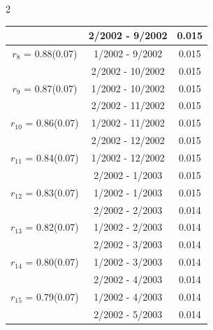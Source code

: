 \begin{multicols}{2}
{\begin{tabular}{ccc}
&        2/2002 -  9/2002 &        0.015  \vspace{-.02in} \\ \hline 
  $r_{ 8}$ = 0.88(0.07) &       1/2002 -  9/2002 &        0.015   \vspace{-.10in} \\  
&        2/2002 - 10/2002 &        0.015  \vspace{-.02in} \\ \hline 
  $r_{ 9}$ = 0.87(0.07) &       1/2002 - 10/2002 &        0.015   \vspace{-.10in} \\  
&        2/2002 - 11/2002 &        0.015  \vspace{-.02in} \\ \hline 
  $r_{10}$ = 0.86(0.07) &       1/2002 - 11/2002 &        0.015   \vspace{-.10in} \\  
&        2/2002 - 12/2002 &        0.015  \vspace{-.02in} \\ \hline 
  $r_{11}$ = 0.84(0.07) &       1/2002 - 12/2002 &        0.015   \vspace{-.10in} \\  
&        2/2002 -  1/2003 &        0.015  \vspace{-.02in} \\ \hline 
  $r_{12}$ = 0.83(0.07) &       1/2002 -  1/2003 &        0.015   \vspace{-.10in} \\  
&        2/2002 -  2/2003 &        0.014  \vspace{-.02in} \\ \hline 
  $r_{13}$ = 0.82(0.07) &       1/2002 -  2/2003 &        0.014   \vspace{-.10in} \\  
&        2/2002 -  3/2003 &        0.014  \vspace{-.02in} \\ \hline 
  $r_{14}$ = 0.80(0.07) &       1/2002 -  3/2003 &        0.014   \vspace{-.10in} \\  
&        2/2002 -  4/2003 &        0.014  \vspace{-.02in} \\ \hline 
  $r_{15}$ = 0.79(0.07) &       1/2002 -  4/2003 &        0.014   \vspace{-.10in} \\  
&        2/2002 -  5/2003 &        0.014  \vspace{-.02in} \\ \hline 

\end{tabular}}
\end{multicols}
